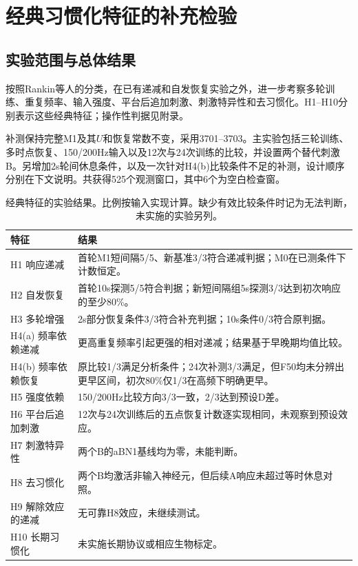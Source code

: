 \section{经典习惯化特征的补充检验}
\label{sec:hallmarks}
\subsection{实验范围与总体结果}
按照Rankin等人的分类\citep{rankin2009}，在已有递减和自发恢复实验之外，进一步考察多轮训练、重复频率、输入强度、平台后追加刺激、刺激特异性和去习惯化。H1--H10分别表示这些经典特征；操作性判据见附录。

补测保持完整M1及其$U$和恢复常数不变，采用3701--3703。主实验包括三轮训练、多时点恢复、150/200Hz输入以及12次与24次训练的比较，并设置两个替代刺激B。另增加2s轮间休息条件，以及一次针对H4(b)比较条件不足的补测，设计顺序分别在下文说明。共获得525个观测窗口，其中6个为空白检查窗。

\begin{table}[!htbp]\centering\small
\caption{经典特征的实验结果。比例按输入实现计算。缺少有效比较条件时记为无法判断，未实施的实验另列。}
\label{tab:hallmarks}
\begin{tabularx}{\linewidth}{L{2.7cm}Y}\toprule
特征 & 结果\\\midrule
H1 响应递减 & 首轮M1短间隔5/5、新基准3/3符合递减判据；M0在已测条件下计数恒定。\\
H2 自发恢复 & 首轮10s探测5/5符合判据；新短间隔组5s探测3/3达到初次响应的至少80\%。\\
H3 多轮增强 & 2s部分恢复条件3/3符合补充判据；10s条件0/3符合原判据。\\
H4(a) 频率依赖递减 & 更高重复频率引起更强的相对递减；结果基于早晚期均值比较。\\
H4(b) 频率依赖恢复 & 原比较1/3满足分析条件；24次补测3/3满足，但F50均未分辨出更早区间，初次80\%仅1/3在高频下明确更早。\\
H5 强度依赖 & 150/200Hz比较方向3/3一致，2/3达到预设D差。\\
H6 平台后追加刺激 & 12次与24次训练后的五点恢复计数逐实现相同，未观察到预设效应。\\
H7 刺激特异性 & 两个B的aBN1基线均为零，未能判断。\\
H8 去习惯化 & 两个B均激活非输入神经元，但后续A响应未超过等时休息对照。\\
H9 解除效应的递减 & 无可靠H8效应，未继续测试。\\
H10 长期习惯化 & 未实施长期协议或相应生物标定。\\\bottomrule
\end{tabularx}\end{table}

